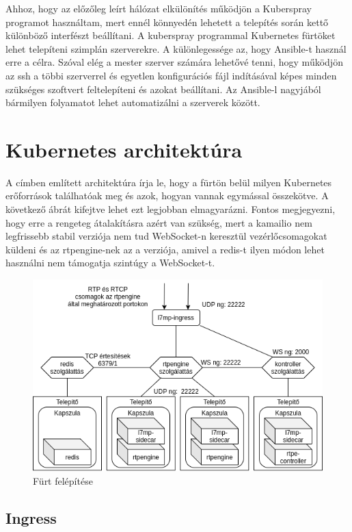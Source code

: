 Ahhoz, hogy az előzőleg leírt hálózat elkülönítés működjön a Kuberspray programot 
használtam, mert ennél könnyedén lehetett a telepítés során kettő különböző interfészt
beállítani. A kuberspray programmal Kubernetes fürtöket lehet telepíteni szimplán
szerverekre. A különlegessége az, hogy Ansible-t használ erre a célra. Szóval elég
a mester szerver számára lehetővé tenni, hogy működjön az ssh a többi szerverrel és
egyetlen konfigurációs fájl indításával képes minden szükséges szoftvert feltelepíteni
és azokat beállítani. Az Ansible-l nagyjából bármilyen folyamatot lehet automatizálni a
szerverek között. 

\section{Kubernetes architektúra}

A címben említett architektúra írja le, hogy a fürtön belül milyen Kubernetes
erőforrások találhatóak meg és azok, hogyan vannak egymással összekötve. A következő
ábrát kifejtve lehet ezt legjobban elmagyarázni. Fontos megjegyezni, hogy erre 
a rengeteg átalakításra azért van szükség, mert a kamailio nem legfrissebb
stabil verziója nem tud WebSocket-n keresztül vezérlőcsomagokat küldeni és az rtpengine-nek
az a verziója, amivel a redis-t ilyen módon lehet használni nem támogatja szintúgy
a WebSocket-t.

\begin{figure}[!ht]
	\centering
	\includegraphics[width=1\textwidth, keepaspectratio]{figures/cluster.png}
	\caption{Fürt felépítése}
	\label{fig:HVSpaces}
\end{figure}

\subsection{Ingress}

